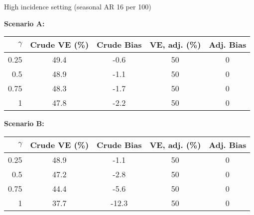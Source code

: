 \documentclass{beamer}
\begin{document}
\begin{frame}{High incidence setting (seasonal AR 16 per 100)}

{\footnotesize
	\textbf{Scenario A:}
	\begin{table}
		\begin{tabular}{rcccc}
			$\gamma$ & Crude VE (\%) & Crude Bias & VE, adj.  (\%)& Adj. Bias \\
			\hline
0.25 & 49.4 & -0.6 & 50 & 0 \\ 
0.5 & 48.9 & -1.1 & 50 & 0 \\ 
0.75 & 48.3 & -1.7 & 50 & 0 \\ 
1 & 47.8 & -2.2 & 50 & 0 \\ 
			\hline
		\end{tabular}
	\end{table}
	
	
	\textbf{Scenario B: }
	\begin{table}
		\begin{tabular}{rcccc}
			$\gamma$ & Crude VE (\%) & Crude Bias & VE, adj.  (\%)& Adj. Bias \\
			\hline
0.25 & 48.9 & -1.1 & 50 & 0 \\ 
0.5 & 47.2 & -2.8 & 50 & 0 \\ 
0.75 & 44.4 & -5.6 & 50 & 0 \\ 
1 & 37.7 & -12.3 & 50 & 0 \\ 
			\hline
		\end{tabular}
	\end{table}
}
\end{frame}
%
\begin{frame}
		\centering
	
\end{frame}
%
\end{document}
